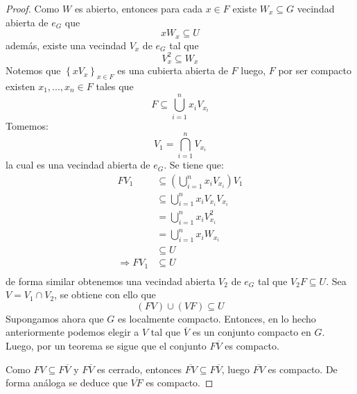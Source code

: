 \documentclass[12pt]{report}
\theoremstyle{largebreak}
\newcommand{\Cls}[1]{\ensuremath{\overline{#1}}}
\begin{document}
    \begin{proof}
        Como $W$ es abierto, entonces para cada $x\in F$ existe $W_x\subseteq G$ vecindad abierta de $e_G$ que
        \begin{equation*}
            xW_x\subseteq U
        \end{equation*}
        además, existe una vecindad $V_x$ de $e_G$ tal que
        \begin{equation*}
            V_x^2\subseteq W_x
        \end{equation*}
        Notemos que $\left\{xV_x \right\}_{x\in F}$ es una cubierta abierta de $F$ luego, $F$ por ser compacto existen $x_1,...,x_n\in F$ tales que
        \begin{equation*}
            F\subseteq \bigcup_{ i=1}^n x_iV_{ x_i}
        \end{equation*}
        Tomemos:
        \begin{equation*}
            V_1=\bigcap_{ i=1}^n V_{ x_i}
        \end{equation*}
        la cual es una vecindad abierta de $e_G$. Se tiene que:
        \begin{equation*}
            \begin{split}
                FV_1&\subseteq \left( \bigcup_{ i=1}^n x_iV_{ x_i}\right)V_1\\
                &\subseteq\bigcup_{ i=1}^n x_iV_{ x_i}V_{ x_i}\\
                &=\bigcup_{ i=1}^n x_iV_{ x_i}^2\\
                &=\bigcup_{ i=1}^n x_iW_{ x_i}\\
                &\subseteq U\\
                \Rightarrow FV_1&\subseteq U\\
            \end{split}
        \end{equation*}
        de forma similar obtenemos una vecindad abierta $V_2$ de $e_G$ tal que $V_2F\subseteq U$. Sea $V=V_1\cap V_2$, se obtiene con ello que
        \begin{equation*}
            (FV)\cup(VF)\subseteq U
        \end{equation*}
        Supongamos ahora que $G$ es localmente compacto. Entonces, en lo hecho anteriormente podemos elegir a $V$ tal que $\Cls{V}$ es un conjunto compacto en $G$. Luego, por un teorema se sigue que el conjunto $F\Cls{V}$ es compacto.
        
        Como $FV\subseteq F\Cls{V}$ y $F\Cls{V}$ es cerrado, entonces $\Cls{FV}\subseteq F\Cls{V}$, luego $\Cls{FV}$ es compacto. De forma análoga se deduce que $\Cls{VF}$ es compacto.
    \end{proof}
\end{document}
